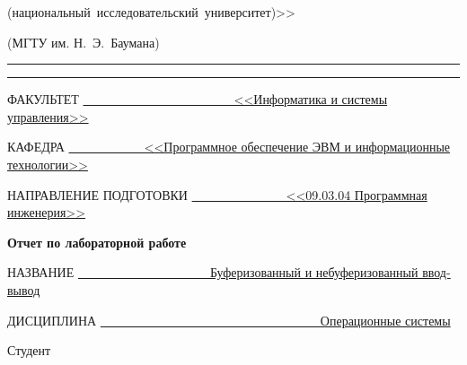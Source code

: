 \begin{titlepage}
\begin{center}
\begin{minipage}{0.85\textwidth}
{{                (национальный~исследовательский~университет)>>
            }

                {(МГТУ им. Н.~Э.~Баумана)}
                \vspace{0.1cm}
            }
        \end{minipage}

        \vspace{0.2cm}
        \rule{\linewidth}{2.8pt}
        \rule[3ex]{\linewidth}{1pt}

        \begin{flushleft}
            {ФАКУЛЬТЕТ \uline{~~~~~~~~~~~~~~~~~~~~~~~~<<Информатика и системы управления>> \hfill}}

            \vspace{0.5cm}

            {КАФЕДРА \uline{~~~~~~~~~~~~<<Программное обеспечение ЭВМ и информационные технологии>> \hfill}}
            
             \vspace{0.5cm}
              
            {НАПРАВЛЕНИЕ ПОДГОТОВКИ \uline{~~~~~~~~~~~~~~~<<09.03.04 Программная инженерия>> \hfill}}
            
        \end{flushleft}

        \vspace{2cm}

        {
           \begin{center}
           	\Large\textbf{{Отчет по лабораторной работе}}\\
           \end{center}
        }
        \vspace{0.5cm}

		\begin{flushleft}
			{НАЗВАНИЕ \uline{~~~~~~~~~~~~~~~~~~~~~Буферизованный и небуферизованный ввод-вывод\hfill}}
			
			\vspace{0.5cm}
			
			{ДИСЦИПЛИНА \uline{~~~~~~~~~~~~~~~~~~~~~~~~~~~~~~~~~~~Операционные системы\hfill}}
			
		\end{flushleft}


        \vfill

        \begin{flushleft}
            {Студент } \hfill
            

\end{flushleft}
\end{center}
\end{titlepage}
